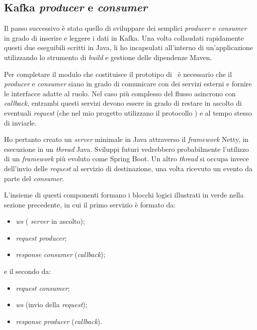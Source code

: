 \subsection{Kafka \textit{producer} e \textit{consumer}}

Il passo successivo è stato quello di sviluppare dei semplici \textit{producer} e \textit{consumer} in grado di inserire e leggere i dati in Kafka.
Una volta collaudati rapidamente questi due eseguibili scritti in Java, li ho incapsulati all'interno di un'applicazione utilizzando lo strumento di \textit{build} e gestione delle dipendenze Maven.

Per completare il modulo che costituisce il prototipo di \middleware\ è necessario che il \textit{producer} e \textit{consumer} siano in grado di comunicare con dei servizi esterni e fornire le interfacce adatte al ruolo.
Nel caso più complesso del flusso asincrono con \textit{callback}, entrambi questi servizi devono essere in grado di restare in ascolto di eventuali  \textit{request} (che nel mio progetto utilizzano il protocollo ) e al tempo stesso di inviarle.

Ho pertanto creato un  \textit{server} minimale in Java attraverso il \textit{framework} Netty, in esecuzione in un \textit{thread} Java.
Sviluppi futuri vedrebbero probabilmente l'utilizzo di un \textit{framework} più evoluto come Spring Boot.
Un altro \textit{thread} si occupa invece dell'invio delle  \textit{request} al servizio di destinazione, una volta ricevuto un evento da parte del \textit{consumer}.

\bigskip\noindent
L'insieme di questi componenti formano i blocchi logici illustrati in verde nella sezione precedente, in cui il primo servizio è formato da:
\begin{itemize}
  \item {} \textit{\acrlong{ws}} ( \textit{server} in ascolto);
  \item \textit{request producer};
  \item \textit{response consumer} (\textit{callback});
\end{itemize}
\noindent
e il secondo da:
\begin{itemize}
  \item \textit{request consumer};
  \item {} \textit{\acrlong{ws}} (invio della \textit{request});
  \item \textit{response producer} (\textit{callback}).
\end{itemize}

